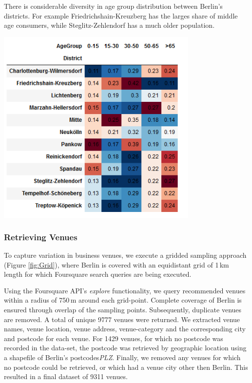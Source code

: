 \documentclass[letter]{scrartcl}
\begin{document}
\begin{table}[h]
\centering
\caption{There is considerable diversity in age group distribution between Berlin's districts. For example Friedrichshain-Kreuzberg has the larges share of middle age consumers, while Steglitz-Zehlendorf has a much older population.}
\includegraphics[width=10cm]{../Figures/BerlinTable_color.PNG}
\label{tab:demo}
\end{table}


\subsubsection{Retrieving Venues}

To capture variation in business venues, we execute a gridded sampling approach (Figure \ref{fig:Grid}), where Berlin is covered with an equidistant grid of 1\,km length for which Foursquare search queries are being executed. 

Using the Foursquare API's \emph{explore} functionality, we query recommended venues within a radius of 750\,m around each grid-point. Complete coverage of Berlin is ensured through overlap of the sampling points. Subsequently, duplicate venues are removed. A total of unique 9777 venues were returned. We extracted venue names, venue location, venue address, venue-category and the corresponding city and postcode for each venue. For 1429 venues, for which no postcode was recorded in the data-set, the postcode was retrieved by geographic location using a shapefile of Berlin's postcodes\emph{PLZ}. Finally, we removed any venues for which no postcode could be retrieved, or which had a venue city other then Berlin. This resulted in a final dataset of 9311 venues. 
\end{document}
